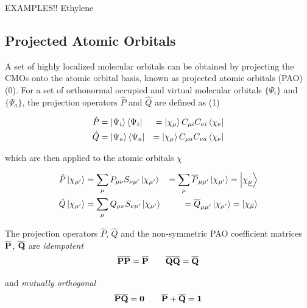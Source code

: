 EXAMPLES!! Ethylene

\subsection{Projected Atomic Orbitals}

A set of highly localized molecular orbitals can be obtained by projecting the CMOs onto the atomic orbital basis, known as projected atomic orbitals (PAO) (0). For a set of orthonormal occupied and virtual molecular orbitals $\{\Psi_i\}$ and $\{\Psi_a\}$, the projection operators $\hat{P}$ and $\hat{Q}$ are defined as (1)

\begin{eqnarray}
\hat{P} &= \ket{\Psi_i} \bra{\Psi_i} &= \ket{\chi_{\mu}} C_{\mu i} C_{\nu i} \bra{\chi_{\nu}} \\
\hat{Q} &= \ket{\Psi_a} \bra{\Psi_a} &= \ket{\chi_{\mu}} C_{\mu a} C_{\nu a} \bra{\chi_{\nu}}
\end{eqnarray}

\noindent which are then applied to the atomic orbitals $\chi$ 

\begin{eqnarray}
\hat{P} \ket{\chi_{\mu'}} &= \sum_{\mu} P_{\mu\nu} S_{\nu\mu'} \ket{\chi_{\mu'}} &= \sum_{\mu} \overline{P}_{\mu \mu'} \ket{\chi_{\mu'}} = \ket{\chi_{\underline{\mu}}} \\
\hat{Q} \ket{\chi_{\mu'}} &= \sum_{\mu} Q_{\mu\nu} S_{\nu\mu'} \ket{\chi_{\mu'}}  &= \overline{Q}_{\mu \mu'} \ket{\chi_{\mu'}} = \ket{\chi_{\overline{\mu}}}
\end{eqnarray} 

The projection operators $\hat{P}$, $\hat{Q}$ and the non-symmetric PAO coefficient matrices $\mathbf{\overline{P}}$, $\mathbf{\overline{Q}}$ are \emph{idempotent}
\begin{equation}
\mathbf{\overline{P}}\mathbf{\overline{P}} = \mathbf{\overline{P}} \qquad
\mathbf{\overline{Q}}\mathbf{\overline{Q}} = \mathbf{\overline{Q}}
\end{equation}

\noindent and \emph{mutually orthogonal} 
\begin{equation}
\mathbf{\overline{P}}\mathbf{\overline{Q}} = \mathbf{0} \qquad \mathbf{\overline{P}} + \mathbf{\overline{Q}} = \mathbf{1} 
\end{equation} 

